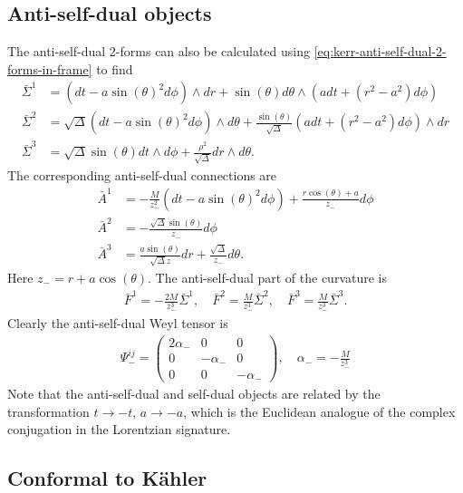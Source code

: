 \documentclass[10pt]{report}
\theoremstyle{definition}
\begin{document}
\subsection{Anti-self-dual objects}

The anti-self-dual 2-forms can also be calculated using \cref{eq:kerr-anti-self-dual-2-forms-in-frame} to find
\begin{align}
    \bar{\Sigma}^1 &= (dt - a\sin(\theta)^2 d\phi) \wedge dr + \sin(\theta) d\theta \wedge ( a dt + (r^2-a^2) d\phi ) \\
    \bar{\Sigma}^2 &= \sqrt{\Delta}(dt-a\sin(\theta)^2 d\phi) \wedge d\theta +\frac{\sin(\theta)}{\sqrt{\Delta}}(a dt + (r^2-a^2) d\phi) \wedge dr \\
    \bar{\Sigma}^3 &= \sqrt{\Delta} \sin(\theta) dt \wedge d\phi + \frac{\rho^2}{\sqrt{\Delta}} dr \wedge d\theta.
\end{align}
The corresponding anti-self-dual connections are 
\begin{align}
    \bar{A}^1 &= -\frac{M}{z_-^2} (dt-a\sin(\theta)^2 d\phi) + \frac{r\cos(\theta) + a}{z_-} d\phi \\
    \bar{A}^2 &= -\frac{\sqrt{\Delta} \sin(\theta)}{z_-} d\phi\\
    \bar{A}^3 &= \frac{a \sin(\theta)}{\sqrt{\Delta} z} dr + \frac{\sqrt{\Delta}}{z_-} d\theta.
\end{align}
Here $z_-=r+a\cos(\theta)$.
The anti-self-dual part of the curvature is 
\begin{align}
    \bar{F}^1 = -\frac{2M}{z_-^3} \bar{\Sigma}^1, \quad \bar{F}^2 = \frac{M}{z_-^3} \bar{\Sigma}^2, \quad \bar{F}^3 = \frac{M}{z_-^3} \bar{\Sigma}^3.
\end{align}
Clearly the anti-self-dual Weyl tensor is 
\begin{align}
    \Psi_-^{ij} = \begin{pmatrix}
        2\alpha_- & 0 & 0 \\
        0 & -\alpha_- & 0 \\
        0 & 0 & -\alpha_-
    \end{pmatrix}, \quad \alpha_- = -\frac{M}{z_-^3}
\end{align}
Note that the anti-self-dual and self-dual objects are related by the transformation $t\rightarrow -t$, $a \rightarrow -a$, which is the Euclidean analogue of the complex conjugation in the Lorentzian signature.

\subsection{Conformal to K\"ahler}
\end{document}
